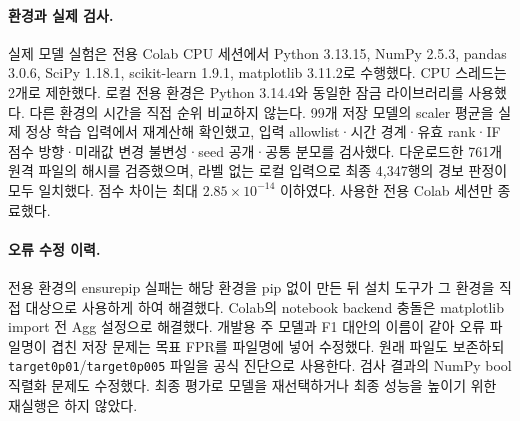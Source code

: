 \documentclass{article}
\newcommand{\code}[1]{\texttt{\small #1}}
\begin{document}
\paragraph{환경과 실제 검사.}
실제 모델 실험은 전용 Colab CPU 세션에서 Python 3.13.15, NumPy 2.5.3, pandas 3.0.6, SciPy 1.18.1, scikit-learn 1.9.1, matplotlib 3.11.2로 수행했다. CPU 스레드는 2개로 제한했다. 로컬 전용 환경은 Python 3.14.4와 동일한 잠금 라이브러리를 사용했다. 다른 환경의 시간을 직접 순위 비교하지 않는다. 99개 저장 모델의 scaler 평균을 실제 정상 학습 입력에서 재계산해 확인했고, 입력 allowlist·시간 경계·유효 rank·IF 점수 방향·미래값 변경 불변성·seed 공개·공통 분모를 검사했다. 다운로드한 761개 원격 파일의 해시를 검증했으며, 라벨 없는 로컬 입력으로 최종 4,347행의 경보 판정이 모두 일치했다. 점수 차이는 최대 $2.85\times10^{-14}$ 이하였다. 사용한 전용 Colab 세션만 종료했다.

\paragraph{오류 수정 이력.}
전용 환경의 ensurepip 실패는 해당 환경을 pip 없이 만든 뒤 설치 도구가 그 환경을 직접 대상으로 사용하게 하여 해결했다. Colab의 notebook backend 충돌은 matplotlib import 전 Agg 설정으로 해결했다. 개발용 주 모델과 F1 대안의 이름이 같아 오류 파일명이 겹친 저장 문제는 목표 FPR를 파일명에 넣어 수정했다. 원래 파일도 보존하되 \code{target0p01}/\code{target0p005} 파일을 공식 진단으로 사용한다. 검사 결과의 NumPy bool 직렬화 문제도 수정했다. 최종 평가로 모델을 재선택하거나 최종 성능을 높이기 위한 재실행은 하지 않았다.
\end{document}
